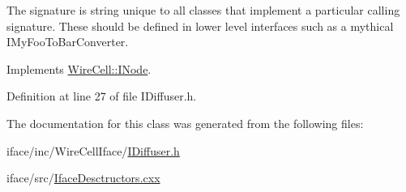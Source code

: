 The signature is string unique to all classes that implement a particular calling signature. These should be defined in lower level interfaces such as a mythical I\+My\+Foo\+To\+Bar\+Converter. 

Implements \hyperlink{class_wire_cell_1_1_i_node_a0b0763465adf5ba7febe8e378162b584}{Wire\+Cell\+::\+I\+Node}.



Definition at line 27 of file I\+Diffuser.\+h.



The documentation for this class was generated from the following files\+:\begin{DoxyCompactItemize}
\item 
iface/inc/\+Wire\+Cell\+Iface/\hyperlink{_i_diffuser_8h}{I\+Diffuser.\+h}\item 
iface/src/\hyperlink{_iface_desctructors_8cxx}{Iface\+Desctructors.\+cxx}\end{DoxyCompactItemize}
